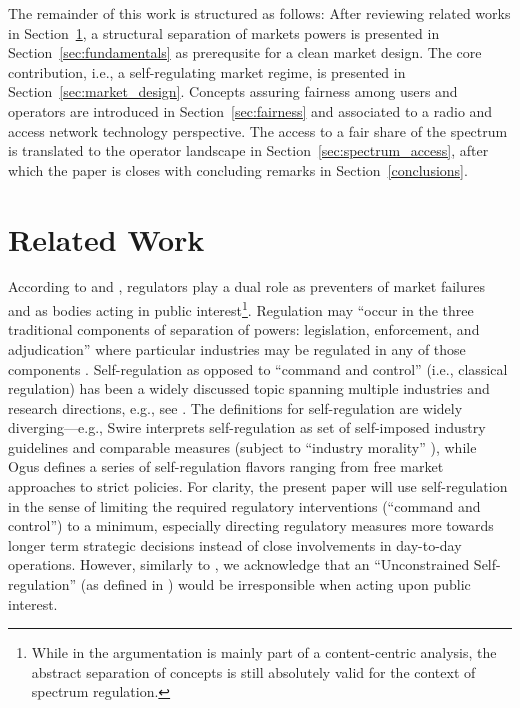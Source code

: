 \documentclass[conference]{IEEEtran}
\newcommand\secref{Section~\ref}
\begin{document}
	 	The remainder of this work is structured as follows: After reviewing related works in \secref{sec:related}, a structural separation of markets powers is presented in \secref{sec:fundamentals} as prerequsite for a clean market design. The core contribution, i.e., a self-regulating market regime, is presented in \secref{sec:market_design}. Concepts assuring fairness among users and operators are introduced in \secref{sec:fairness} and associated to a radio and access network technology perspective. The access to a fair share of the spectrum is translated to the operator landscape in \secref{sec:spectrum_access}, after which the paper is closes with concluding remarks in \secref{conclusions}.
	 	




\section{Related Work}
\label{sec:related}


According to \cite{kpmg96} and \cite{blackman1998convergence}, regulators play a dual role as preventers of market failures and as bodies acting in public interest\footnote{While in \cite{blackman1998convergence} the argumentation is mainly part of a content-centric analysis, the abstract separation of concepts is still absolutely valid for the context of spectrum regulation.}. Regulation may ``occur in the three traditional components of separation of powers: legislation, enforcement, and adjudication''  where particular industries may be regulated in any of those components \cite{swire1997markets}. Self-regulation as opposed to ``command and control'' \cite{sinclair1997self} (i.e., classical regulation) has been a widely discussed topic spanning multiple industries and research directions, e.g., see \cite{sinclair1997self,ogus1995rethinking,king2000industry,swire1997markets}. The definitions for self-regulation are widely diverging---e.g., Swire \cite{swire1997markets}  interprets self-regulation as set of self-imposed industry guidelines and comparable measures (subject to ``industry morality'' \cite{king2000industry}), while Ogus \cite{ogus1995rethinking} defines a series of self-regulation flavors ranging from free market approaches to strict policies. For clarity, the present paper will use self-regulation in the sense of limiting the required regulatory interventions (``command and control'') to a minimum, especially directing regulatory measures more towards longer term strategic decisions instead of close involvements in day-to-day operations. However, similarly to \cite{blackman1998convergence}, we acknowledge that an ``Unconstrained Self-regulation'' (as defined in \cite{ogus1995rethinking}) would be irresponsible when acting upon public interest. 
\end{document}

